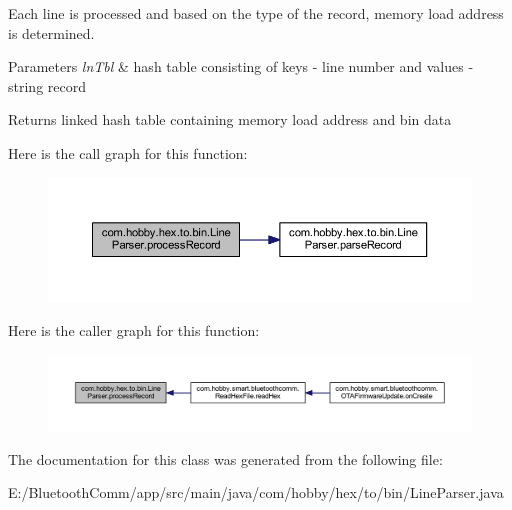 Each line is processed and based on the type of the record, memory load address is determined.


\begin{DoxyParams}{Parameters}
{\em ln\+Tbl} & hash table consisting of keys -\/ line number and values -\/ string record \\
\hline
\end{DoxyParams}
\begin{DoxyReturn}{Returns}
linked hash table containing memory load address and bin data 
\end{DoxyReturn}
Here is the call graph for this function\+:\nopagebreak
\begin{figure}[H]
\begin{center}
\leavevmode
\includegraphics[width=350pt]{classcom_1_1hobby_1_1hex_1_1to_1_1bin_1_1_line_parser_acfc2f3e7d365d31f5e7603a4e86c4671_cgraph}
\end{center}
\end{figure}
Here is the caller graph for this function\+:\nopagebreak
\begin{figure}[H]
\begin{center}
\leavevmode
\includegraphics[width=350pt]{classcom_1_1hobby_1_1hex_1_1to_1_1bin_1_1_line_parser_acfc2f3e7d365d31f5e7603a4e86c4671_icgraph}
\end{center}
\end{figure}


The documentation for this class was generated from the following file\+:\begin{DoxyCompactItemize}
\item 
E\+:/\+Bluetooth\+Comm/app/src/main/java/com/hobby/hex/to/bin/Line\+Parser.\+java\end{DoxyCompactItemize}
